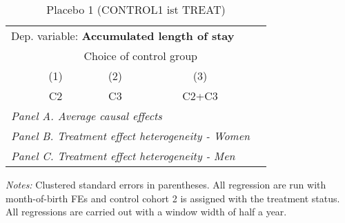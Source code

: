  \begin{table}[H] \centering \begin{threeparttable} \caption{Placebo 1 (CONTROL1 ist TREAT) } {\def\sym#1{\ifmmode^{#1}\else\(^{#1}\)\fi} \begin{tabular}{l*{4}{c}} \toprule \multicolumn{4}{l}{Dep. variable: \textbf{Accumulated length of stay}} \\ & \multicolumn{3}{c}{Choice of control group} \\ \cmidrule(lr){2-4}
            &\multicolumn{1}{c}{(1)}&\multicolumn{1}{c}{(2)}&\multicolumn{1}{c}{(3)}\\
            &\multicolumn{1}{c}{C2}&\multicolumn{1}{c}{C3}&\multicolumn{1}{c}{C2+C3}\\
\midrule
 \multicolumn{4}{l}{\emph{Panel A. Average causal effects}} \\      \midrule\multicolumn{4}{l}{\emph{Panel B. Treatment effect heterogeneity - Women}} \\      \midrule\multicolumn{4}{l}{\emph{Panel C. Treatment effect heterogeneity - Men}} \\      
\bottomrule \end{tabular} } \begin{tablenotes} \item \scriptsize \emph{Notes:} Clustered standard errors in parentheses. All regression are run with month-of-birth FEs and control cohort 2 is assigned with the treatment status. All regressions are carried out with a window width of half a year. \end{tablenotes} \end{threeparttable} \end{table} 
